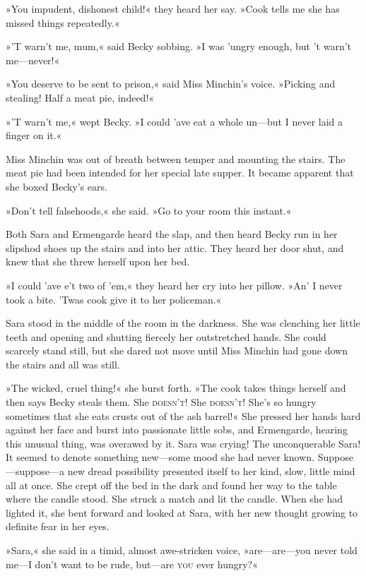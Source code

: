 »You impudent, dishonest child!« they heard her say. »Cook tells me she has missed things repeatedly.«

»'T warn't me, mum,« said Becky sobbing. »I was 'ungry enough, but 't warn't me—never!«

»You deserve to be sent to prison,« said Miss Minchin's voice. »Picking and stealing! Half a meat pie, indeed!«

»'T warn't me,« wept Becky. »I could 'ave eat a whole un—but I never laid a finger on it.«

Miss Minchin was out of breath between temper and mounting the stairs. The meat pie had been intended for her special late supper. It became apparent that she boxed Becky's ears.

»Don't tell falsehoods,« she said. »Go to your room this instant.«

Both Sara and Ermengarde heard the slap, and then heard Becky run in her slipshod shoes up the stairs and into her attic. They heard her door shut, and knew that she threw herself upon her bed.

»I could 'ave e't two of 'em,« they heard her cry into her pillow. »An' I never took a bite. 'Twas cook give it to her policeman.«

Sara stood in the middle of the room in the darkness. She was clenching her little teeth and opening and shutting fiercely her outstretched hands. She could scarcely stand still, but she dared not move until Miss Minchin had gone down the stairs and all was still.

»The wicked, cruel thing!« she burst forth. »The cook takes things herself and then says Becky steals them. She \textsc{doesn't}! She \textsc{doesn't}! She's so hungry sometimes that she eats crusts out of the ash barrel!« She pressed her hands hard against her face and burst into passionate little sobs, and Ermengarde, hearing this unusual thing, was overawed by it. Sara was crying! The unconquerable Sara! It seemed to denote something new—some mood she had never known. Suppose—suppose—a new dread possibility presented itself to her kind, slow, little mind all at once. She crept off the bed in the dark and found her way to the table where the candle stood. She struck a match and lit the candle. When she had lighted it, she bent forward and looked at Sara, with her new thought growing to definite fear in her eyes.

»Sara,« she said in a timid, almost awe-stricken voice, »are—are—you never told me—I don't want to be rude, but—are \textsc{you} ever hungry?«

